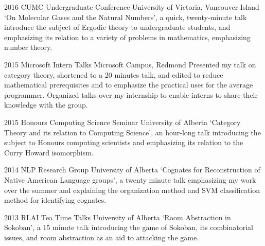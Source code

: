 \documentclass{friggeri-cv} %
\begin{document}
\begin{entrylist}


\entry
{2016}
{CUMC Undergraduate Conference}
{University of Victoria, Vancouver Island}
{`On Molecular Gases and the Natural Numbers', a quick, twenty-minute talk introduce the subject of Ergodic theory to undergraduate students, and emphasizing its relation to a variety of problems in mathematics, emphasizing number theory.}


\entry
{2015}
{Microsoft Intern Talks}
{Microsoft Campus, Redmond}
{Presented my talk on category theory, shortened to a 20 minutes talk, and edited to reduce mathematical prerequisites and to emphasize the practical uses for the average programmer. Organized talks over my internship to enable interns to share their knowledge with the group.}


\entry
{2015}
{Honours Computing Science Seminar}
{University of Alberta}
{`Category Theory and its relation to Computing Science', an hour-long talk introducing the subject to Honours computing scientists and emphasizing its relation to the Curry Howard isomorphism.}


\entry
{2014}
{NLP Research Group}
{University of Alberta}
{`Cognates for Reconstruction of Native American Language groups', a twenty minute talk emphasizing my work over the summer and explaining the organization method and SVM classification method for identifying cognates.}


\entry
{2013}
{RLAI Tea Time Talks}
{University of Alberta}
{`Room Abstraction in Sokoban', a 15 minute talk introducing the game of Sokoban, its combinatorial issues, and room abstraction as an aid to attacking the game.}

\end{entrylist}


\end{document}
